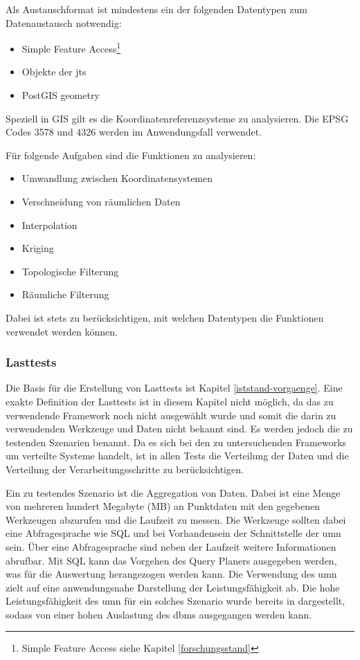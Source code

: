 Als Austauschformat ist mindestens ein der folgenden Datentypen zum Datenaustausch notwendig:
\begin{itemize}
\item Simple Feature Access\footnote{Simple Feature Access siehe Kapitel \ref{forschungsstand}}
\item Objekte der \Gls{jts}
\item PostGIS geometry
\end{itemize}

Speziell in GIS gilt es die Koordinatenreferenzsysteme zu analysieren.
Die EPSG Codes 3578 und 4326 werden im Anwendungsfall verwendet.

Für folgende Aufgaben sind die Funktionen zu analysieren:
\begin{itemize}
\setlength{\itemsep}{-8pt}
\item Umwandlung zwischen Koordinatensystemen
\item Verschneidung von räumlichen Daten
\item Interpolation
\item Kriging
\item Topologische Filterung
\item Räumliche Filterung
\end{itemize}
Dabei ist stets zu berücksichtigen, mit welchen Datentypen die Funktionen verwendet werden können.

\subsubsection{Lasttests}
Die Basis für die Erstellung von Lasttests ist Kapitel \ref{iststand-vorgaenge}.
Eine exakte Definition der Lasttests ist in diesem Kapitel nicht möglich, da das zu verwendende Framework noch nicht ausgewählt wurde und somit die darin zu verwendenden Werkzeuge und Daten nicht bekannt sind.
Es werden jedoch die zu testenden Szenarien benannt.
Da es sich bei den zu untersuchenden Frameworks um verteilte Systeme handelt, ist in allen Tests die Verteilung der Daten und die Verteilung der Verarbeitungsschritte zu berücksichtigen.

Ein zu testendes Szenario ist die Aggregation von Daten.
Dabei ist eine Menge von mehreren hundert Megabyte (MB) an Punktdaten mit den gegebenen Werkzeugen abzurufen und die Laufzeit zu messen.
Die Werkzeuge sollten dabei eine Abfragesprache wie SQL und bei Vorhandensein der Schnittstelle der \Gls{umn} sein.
Über eine Abfragesprache sind neben der Laufzeit weitere Informationen abrufbar.
Mit SQL kann das Vorgehen des Query Planers ausgegeben werden, was für die Auswertung herangezogen werden kann.
Die Verwendung des \Gls{umn} zielt auf eine anwendungsnahe Darstellung der Leistungsfähigkeit ab.
Die hohe Leistungsfähigkeit des \Gls{umn} für ein solches Szenario wurde bereits in \cite{ba:kurt} dargestellt, sodass von einer hohen Auslastung des \Gls{dbms} ausgegangen werden kann.

